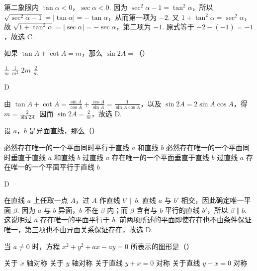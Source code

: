 \documentclass[UTF8,a4paper,oneside,11pt]{ctexbook}
\begin{document}
\begin{solution}
第二象限内 \(\tan\alpha<0\)，\(\sec\alpha<0\). 因为 \(\sec^2\alpha-1=\tan^2\alpha\)，所以 \(\sqrt{\sec^2\alpha-1}=|\tan\alpha|=-\tan\alpha\)，从而第一项为 \(-2\). 又 \(1+\tan^2\alpha=\sec^2\alpha\)，故 \(\sqrt{1+\tan^2\alpha}=|\sec\alpha|=-\sec\alpha\)，第二项为 \(-1\). 原式等于 \(-2-(-1)=-1\)，故选 C.
\end{solution}

\begin{problem}
如果 \(\tan A + \cot A = m\)，那么 \(\sin 2A =\)（\quad）

\choices
    {\(\frac{1}{m}\)}
    {\(\frac{1}{m^2}\)}
    {\(2m\)}
    {\(\frac{2}{m}\)}
\end{problem}

\begin{answer}
D
\end{answer}

\begin{solution}
由 \(\tan A+\cot A=\frac{\sin A}{\cos A}+\frac{\cos A}{\sin A}=\frac{1}{\sin A\cos A}\)，以及 \(\sin2A=2\sin A\cos A\)，得 \(m=\frac{2}{\sin2A}\). 因而 \(\sin2A=\frac{2}{m}\)，故选 D.
\end{solution}

\begin{problem}
设 \(a\)，\(b\) 是异面直线，那么（\quad）

\choices
    {必然存在唯一的一个平面同时平行于直线 \(a\) 和直线 \(b\)}
    {必然存在唯一的一个平面同时垂直于直线 \(a\) 和直线 \(b\)}
    {过直线 \(a\) 存在唯一的一个平面垂直于直线 \(b\)}
    {过直线 \(a\) 存在唯一的一个平面平行于直线 \(b\)}
\end{problem}

\begin{answer}
D
\end{answer}

\begin{solution}
在直线 \(a\) 上任取一点 \(A\)，过 \(A\) 作直线 \(b'\parallel b\). 直线 \(a\) 与 \(b'\) 相交，因此确定唯一平面 \(\beta\). 因为 \(a\) 与 \(b\) 异面，\(b\) 不在 \(\beta\) 内；而 \(\beta\) 含有与 \(b\) 平行的直线 \(b'\)，所以 \(\beta\parallel b\). 这说明过 \(a\) 存在唯一的平面平行于 \(b\). 前两项所述的平面即使存在也不由条件保证唯一，第三项也不由异面关系保证存在，故选 D.
\end{solution}

\begin{problem}
当 \(a \neq 0\) 时，方程 \(x^2 + y^2 + ax - ay = 0\) 所表示的图形是（\quad）

\choices
    {关于 \(x\) 轴对称}
    {关于 \(y\) 轴对称}
    {关于直线 \(y + x = 0\) 对称}
    {关于直线 \(y - x = 0\) 对称}
\end{problem}
\end{document}
